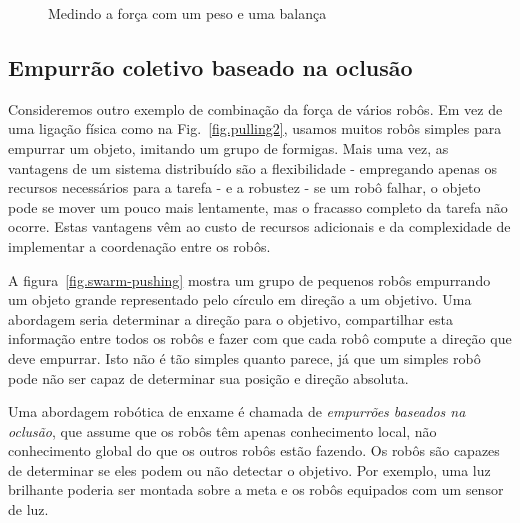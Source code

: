 \begin{figure}
\begin{center}
\caption{Medindo a força com um peso e uma balança}\label{fig.scale}
\end{center}
\end{figure}

\subsection{Empurrão coletivo baseado na oclusão}

Consideremos outro exemplo de combinação da força de vários robôs. Em vez de uma ligação física como na Fig.~\ref{fig.pulling2}, usamos muitos robôs simples para empurrar um objeto, imitando um grupo de formigas. Mais uma vez, as vantagens de um sistema distribuído são a flexibilidade - empregando apenas os recursos necessários para a tarefa - e a robustez - se um robô falhar, o objeto pode se mover um pouco mais lentamente, mas o fracasso completo da tarefa não ocorre. Estas vantagens vêm ao custo de recursos adicionais e da complexidade de implementar a coordenação entre os robôs.

A figura~\ref{fig.swarm-pushing} mostra um grupo de pequenos robôs empurrando um objeto grande representado pelo círculo em direção a um objetivo. Uma abordagem seria determinar a direção para o objetivo, compartilhar esta informação entre todos os robôs e fazer com que cada robô compute a direção que deve empurrar. Isto não é tão simples quanto parece, já que um simples robô pode não ser capaz de determinar sua posição e direção absoluta.

Uma abordagem robótica de enxame é chamada de \emph{empurrões baseados na oclusão}, que assume que os robôs têm apenas conhecimento local, não conhecimento global do que os outros robôs estão fazendo. Os robôs são capazes de determinar se eles podem ou não detectar o objetivo. Por exemplo, uma luz brilhante poderia ser montada sobre a meta e os robôs equipados com um sensor de luz. 

